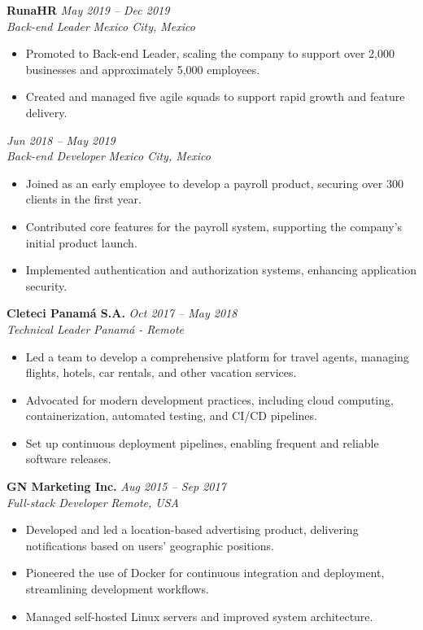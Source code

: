 \documentclass[a4paper,10pt]{article}
\begin{document}
\textbf{RunaHR} \hfill \textit{May 2019 -- Dec 2019}\\
\textit{Back-end Leader} \hfill \textit{Mexico City, Mexico}\\
\begin{itemize}[leftmargin=0.5cm, topsep=0pt, parsep=0pt, itemsep=2pt]
	\item Promoted to Back-end Leader, scaling the company to support over 2,000
	      businesses and approximately 5,000 employees.
	\item Created and managed five agile squads to support rapid growth and
	      feature delivery.
\end{itemize}

\textbf{} \hfill \textit{Jun 2018 -- May 2019}\\
\textit{Back-end Developer} \hfill \textit{Mexico City, Mexico}\\
\begin{itemize}[leftmargin=0.5cm, topsep=0pt, parsep=0pt, itemsep=2pt]
	\item Joined as an early employee to develop a payroll product, securing
	      over 300 clients in the first year.
	\item Contributed core features for the payroll system, supporting the
	      company’s initial product launch.
	\item Implemented authentication and authorization systems, enhancing
	      application security.
\end{itemize}

\textbf{Cleteci Panamá S.A.} \hfill \textit{Oct 2017 -- May 2018}\\
\textit{Technical Leader} \hfill \textit{Panamá - Remote}\\
\begin{itemize}[leftmargin=0.5cm, topsep=0pt, parsep=0pt, itemsep=2pt]
	\item Led a team to develop a comprehensive platform for travel agents,
	      managing flights, hotels, car rentals, and other vacation services.
	\item Advocated for modern development practices, including cloud computing,
	      containerization, automated testing, and CI/CD pipelines.
	\item Set up continuous deployment pipelines, enabling frequent and reliable
	      software releases.
\end{itemize}

\textbf{GN Marketing Inc.} \hfill \textit{Aug 2015 -- Sep 2017}\\
\textit{Full-stack Developer} \hfill \textit{Remote, USA}\\
\begin{itemize}[leftmargin=0.5cm, topsep=0pt, parsep=0pt, itemsep=2pt]
	\item Developed and led a location-based advertising product, delivering
	      notifications based on users’ geographic positions.
	\item Pioneered the use of Docker for continuous integration and deployment,
	      streamlining development workflows.
	\item Managed self-hosted Linux servers and improved system architecture.
\end{itemize}
\end{document}
